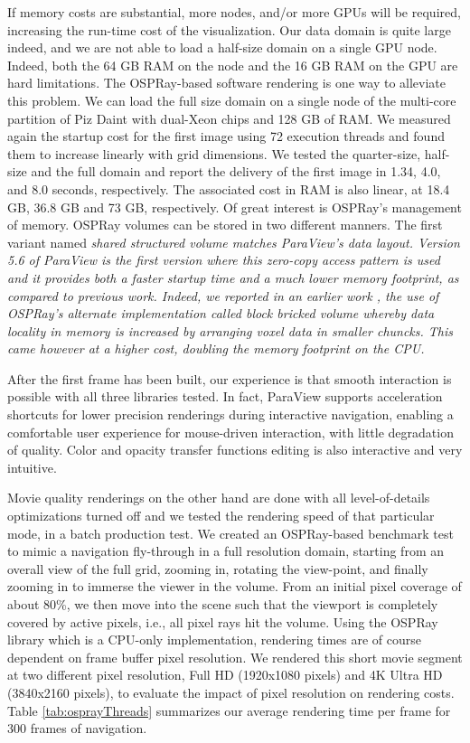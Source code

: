 \documentclass[5p,times]{elsarticle}
\begin{document}
If memory costs are substantial, more nodes, and/or more GPUs will be required,
increasing the run-time cost of the visualization. Our data domain is quite large
indeed, and we are not able to load a half-size domain on a single GPU node. Indeed, both
the 64 GB RAM on the node and the 16 GB RAM on the GPU are hard limitations.
The OSPRay-based software rendering is one way to alleviate this problem. We can load the full size
domain on a single node of  the multi-core partition of Piz Daint with dual-Xeon
chips and 128 GB of RAM. We measured again the startup cost for the first image
using 72 execution threads and found them to increase linearly with grid dimensions.
We tested the quarter-size, half-size and the full domain and report the delivery
of the first image in 1.34, 4.0, and 8.0 seconds, respectively. The associated cost
in RAM is also linear, at 18.4 GB, 36.8 GB and 73 GB, respectively. Of great interest
is OSPRay's management of memory. OSPRay volumes can be stored in two different manners.
The first variant named \it{shared structured volume} \rm matches ParaView's data layout.
Version 5.6 of ParaView is the first version where this zero-copy access pattern is used
and it provides both a faster startup time and a much lower memory footprint, as compared
to previous work. Indeed, we reported in an earlier work \cite{SC18ThermalConvection},
the use of OSPRay's alternate implementation called \it{block bricked volume} \rm whereby
data locality in memory is increased by arranging voxel data in smaller chuncks. This came
however at a higher cost, doubling the memory footprint on the CPU. 
 
After the first frame has been built, our experience is that smooth interaction
is possible with all three libraries tested. In fact, ParaView supports acceleration
shortcuts for lower precision renderings during interactive navigation,
enabling a comfortable user experience for mouse-driven interaction,
with little degradation of quality. 
Color and opacity transfer functions editing is also interactive and very intuitive.

Movie quality renderings on the other hand are done with all level-of-details optimizations turned off and we tested the rendering speed of that particular mode, in a batch production test.
We created an OSPRay-based benchmark test to mimic a navigation fly-through in
a full resolution domain, starting from an overall view of the full grid, zooming in, rotating
the view-point, and finally zooming in to immerse the viewer in the volume. From
an initial pixel coverage of about 80\%, we then move into the scene such that
the viewport is completely covered by active pixels, i.e., all pixel rays hit the volume.
Using the OSPRay library which is a CPU-only implementation, rendering times are of course
dependent on frame buffer pixel resolution. We rendered this short movie segment
at two different pixel resolution, Full HD (1920x1080 pixels) and 4K Ultra HD (3840x2160 pixels),
to evaluate the impact of pixel resolution on rendering costs.
Table \ref{tab:osprayThreads} summarizes
our average rendering time per frame for 300 frames of navigation.
\end{document}
